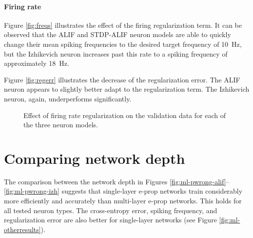 	\paragraph{Firing rate}
		Figure \ref{fig:freqs} illustrates the effect of the firing regularization term.
		It can be observed that the ALIF and STDP-ALIF neuron models are able to quickly change their mean spiking frequencies to the desired target frequency of \SI{10}{\Hz}, but the Izhikevich neuron increases past this rate to a spiking frequency of approximately \SI{18}{\Hz}.

		Figure \ref{fig:regerr} illustrates the decrease of the regularization error.
		The ALIF neuron appears to slightly better adapt to the regularization term.
		The Izhikevich neuron, again, underperforms significantly.
		\begin{figure}[bth]
		    \myfloatalign
		     \quad
		    \caption[Effect of firing rate regularization for each of the three neuron models.]{Effect of firing rate regularization on the validation data for each of the three neuron models.}\label{fig:sl-reg}
		\end{figure}

\section{Comparing network depth}
The comparison between the network depth in Figures \ref{fig:ml-pwrong-alif}--\ref{fig:ml-pwrong-izh} suggests that single-layer e-prop networks train considerably more efficiently and accurately than multi-layer e-prop networks.
This holds for all tested neuron types.
The cross-entropy error, spiking frequency, and regularization error are also better for single-layer networks (see Figure \ref{fig:ml-otherresults}).

